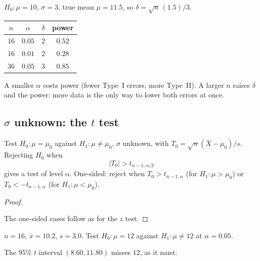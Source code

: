 \begin{example}
$H_0:\mu=10$, $\sigma=3$, true mean $\mu=11.5$, so $\delta=\sqrt n\,(1.5)/3$.
\begin{center}
\begin{tabular}{@{}cccc@{}}
\toprule
$n$ & $\alpha$ & $\delta$ & power \\
\midrule
$16$ & $0.05$ & $2$ & $0.52$ \\
$16$ & $0.01$ & $2$ & $0.28$ \\
$36$ & $0.05$ & $3$ & $0.85$ \\
\bottomrule
\end{tabular}
\end{center}
A smaller $\alpha$ costs power (fewer Type~I errors, more Type~II). A larger $n$ raises $\delta$ and the power: more data is the only way to lower both errors at once.
\end{example}

\subsection*{$\sigma$ unknown: the $t$ test}

\begin{theorem}
Test $H_0:\mu=\mu_0$ against $H_1:\mu\ne\mu_0$, $\sigma$ unknown, with $T_0=\sqrt n(\bar X-\mu_0)/s$. Rejecting $H_0$ when
\[
  \boxed{\;|T_0|>t_{n-1,\alpha/2}\;}
\]
gives a test of level $\alpha$. One-sided: reject when $T_0>t_{n-1,\alpha}$ (for $H_1:\mu>\mu_0$) or $T_0<-t_{n-1,\alpha}$ (for $H_1:\mu<\mu_0$).
\end{theorem}
\begin{proof}
\begin{deriv}
\end{deriv}
The one-sided cases follow as for the $z$ test.
\end{proof}

\begin{example}[A $t$ test]
$n=16$, $\bar x=10.2$, $s=3.0$. Test $H_0:\mu=12$ against $H_1:\mu\ne12$ at $\alpha=0.05$.
\begin{deriv}
\end{deriv}
The $95\%$ $t$ interval $(8.60,11.80)$ misses $12$, as it must.
\end{example}

